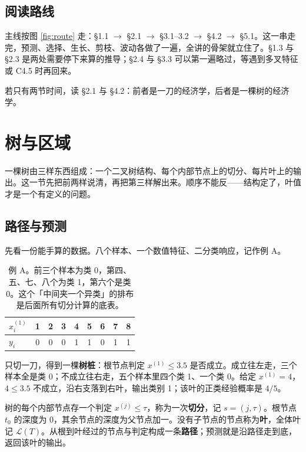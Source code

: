 \documentclass[11pt,a4paper,fontset=windows,zihao=-4]{ctexart}
\newcommand{\Lcal}{\mathcal{L}}
\newcommand{\tabhead}{\sffamily\bfseries\color{navy}}
\begin{document}
\subsection*{阅读路线}

主线按图 \ref{fig:route} 走：§1.1 $\to$ §2.1 $\to$ §3.1--3.2 $\to$ §4.2 $\to$ §5.1。这一串走完，预测、选择、生长、剪枝、波动各做了一遍，全讲的骨架就立住了。§1.3 与 §2.3 是两处需要停下来算的推导；§2.4 与 §3.3 可以第一遍略过，等遇到多叉特征或 C4.5 时再回来。

若只有两节时间，读 §2.1 与 §4.2：前者是一刀的经济学，后者是一棵树的经济学。


\section{树与区域}

一棵树由三样东西组成：一个二叉树结构、每个内部节点上的切分、每片叶上的输出。这一节先把前两样说清，再把第三样解出来。顺序不能反——结构定了，叶值才是一个有定义的问题。

\subsection{路径与预测}

先看一份能手算的数据。八个样本、一个数值特征、二分类响应，记作例 A。

\begin{table}[htbp]
\centering
\small
\begin{tabular}{@{}lcccccccc@{}}
\toprule
\rowcolor{navy!7}
\tabhead $x_i^{(1)}$ & 1 & 2 & 3 & 4 & 5 & 6 & 7 & 8\\
\midrule
$y_i$ & 0 & 0 & 0 & 1 & 1 & 0 & 1 & 1\\
\bottomrule
\end{tabular}
\caption{例 A。前三个样本为类 0，第四、五、七、八个为类 1，第六个是类 0。这个「中间夹一个异类」的排布是后面所有切分计算的底表。}
\label{tab:exA}
\end{table}

只切一刀，得到一棵\textbf{树桩}：根节点判定 $x^{(1)}\le 3.5$ 是否成立。成立往左走，三个样本全是类 0；不成立往右走，五个样本里四个类 1、一个类 0。给定 $x^{(1)}=4$，$4\le3.5$ 不成立，沿右支落到右叶，输出类别 1；该叶的正类经验概率是 $4/5$。

\begin{dfn}[树、节点与路径]
树的每个内部节点存一个判定 $x^{(j)}\le\tau$，称为一次\textbf{切分}，记 $s=(j,\tau)$。根节点 $t_0$ 的深度为 0，其余节点的深度为父节点加一。没有子节点的节点称为\textbf{叶}，全体叶记 $\Lcal(T)$。从根到叶经过的节点与判定构成一条\textbf{路径}；预测就是沿路径走到底，返回该叶的输出。
\end{dfn}
\end{document}
